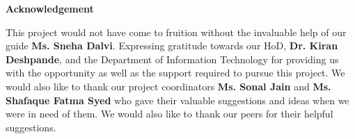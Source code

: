 \newpage
{}
\thispagestyle{empty}

\vspace*{-1cm} 

\begin{center}
    \large\textbf{Acknowledgement}
\end{center}

\vspace{1cm} 

\par
This project would not have come to fruition without the invaluable help of our guide \textbf{Ms. Sneha Dalvi}. Expressing gratitude towards our HoD, \textbf{Dr. Kiran Deshpande}, and the Department of Information Technology for providing us with the opportunity as well as the support required to pursue this project. We would also like to thank our project coordinators \textbf{Ms. Sonal Jain} and \textbf{Ms. Shafaque Fatma Syed} who gave their valuable suggestions and ideas when we were in need of them. We would also like to thank our peers for their helpful suggestions. 

\newpage